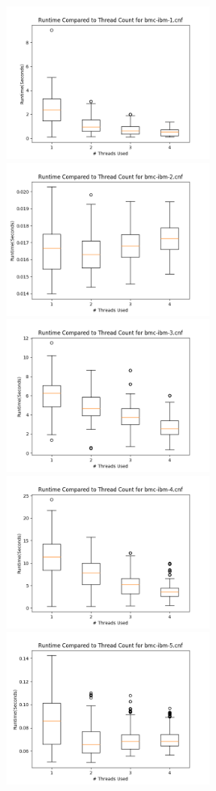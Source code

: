 \documentclass[11pt]{extarticle}
\begin{document}
\noindent
\includegraphics[width=0.5\textwidth]{figures/bmc-ibm-1.png}
\includegraphics[width=0.5\textwidth]{figures/bmc-ibm-2.png}
\includegraphics[width=0.5\textwidth]{figures/bmc-ibm-3.png}
\includegraphics[width=0.5\textwidth]{figures/bmc-ibm-4.png}
\includegraphics[width=0.5\textwidth]{figures/bmc-ibm-5.png}
\end{document}
